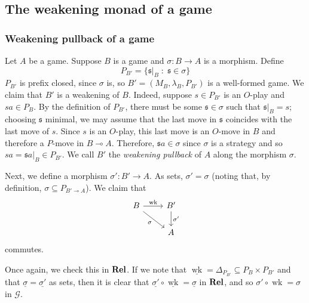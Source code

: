 \documentclass[11pt]{article} %
\theoremstyle{plain} %
\theoremstyle{definition} %
\theoremstyle{note}
\theoremstyle{exercisestyle}
\newcommand{\catname}[1]{{\normalfont\textbf{#1}}}
\newcommand{\Rel}{\catname{Rel}}
\newcommand*\from{\colon}
\newcommand{\cmap}[3]{#1\from{}#2\to{}#3}
\renewcommand{\implies}{\multimap}
\newcommand{\comp}[2]{#1 \circ #2}
\newcommand{\G}{\mathcal G}
\newcommand{\suchthat}{\;\colon\;}
\newcommand{\s}{\mathfrak s}
\newcommand{\grel}[1]{\underline{#1}}
\DeclareMathOperator{\wk}{wk}
\renewcommand{\subset}{\subseteq}
\begin{document}
\subsection{The weakening monad of a game}

\subsubsection{Weakening pullback of a game}

Let $A$ be a game.  Suppose $B$ is a game and $\cmap{\sigma}{B}{A}$ is a morphism.  Define
\[
  P_{B'}=\{\s\vert_B\suchthat \s\in\sigma\}
  \]
$P_{B'}$ is prefix closed, since $\sigma$ is, so $B'=(M_B, \lambda_B, P_{B'})$ is a well-formed game.  We claim that $B'$ is a weakening of $B$.  Indeed, suppose $s\in P_{B'}$ is an $O$-play and $sa\in P_B$.  By the definition of $P_{B'}$, there must be some $\s\in\sigma$ such that $\s\vert_B=s$; choosing $\s$ minimal, we may assume that the last move in $\s$ coincides with the last move of $s$.  Since $s$ is an $O$-play, this last move is an $O$-move in $B$ and therefore a $P$-move in $B\implies A$.  Therefore, $\s a\in \sigma$ since $\sigma$ is a strategy and so $sa=\s a\vert_B\in P_{B'}$.  We call $B'$ the \emph{weakening pullback} of $A$ along the morphism $\sigma$.

Next, we define a morphism $\cmap{\sigma'}{B'}{A}$.  As sets, $\sigma'=\sigma$ (noting that, by definition, $\sigma\subset P_{B'\implies A}$).  We claim that
\[
  \begin{tikzcd}
    B \arrow[r, "\wk"] \arrow[dr, "\sigma"']
      & B' \arrow[d, "\sigma'"] \\
      & A
  \end{tikzcd}
  \]
commutes.

Once again, we check this in $\Rel$.  If we note that $\grel\wk=\Delta_{P_{B'}}\subset P_B\times P_{B'}$ and that $\grel\sigma=\grel{\sigma'}$ as sets, then it is clear that $\comp{\grel{\sigma'}}{\grel\wk}=\grel\sigma$ in $\Rel$, and so $\comp{\sigma'}{\wk}=\sigma$ in $\G$.
\end{document}
